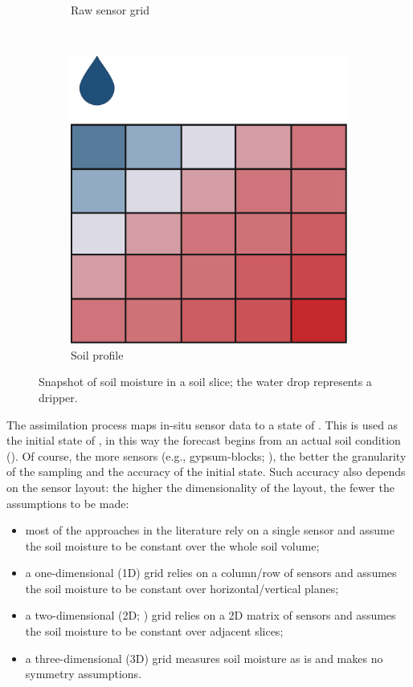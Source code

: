 \begin{figure}[t]
\begin{subfigure}[t]{.3\textwidth}
\caption{Raw sensor grid}
\label{orchard-fig:moisture-sens}
\end{subfigure}
~
\begin{subfigure}[t]{.3\textwidth}
\centering
\includegraphics[scale=.15]{chapters/physics-aware/orchard/img/soil-moisture-profile.pdf}
\caption{Soil profile}
\label{orchard-fig:moisture-profile}
\end{subfigure}
\caption{Snapshot of soil moisture in a soil slice; the water drop represents a dripper.}
\label{orchard-fig:moisture}
\end{figure}

The assimilation process maps in-situ sensor data to a state of \olab{}.
This is used as the initial state of \olab{}, in this way the forecast begins from an actual soil condition ().
Of course, the more sensors (e.g., gypsum-blocks; ), the better the granularity of the sampling and the accuracy of the initial state.
Such accuracy also depends on the sensor layout: the higher the dimensionality of the layout, the fewer the assumptions to be made:
\begin{itemize}
    \item most of the approaches in the literature rely on a single sensor and assume the soil moisture to be constant over the whole soil volume;
    \item a one-dimensional (1D) grid relies on a column/row of sensors and assumes the soil moisture to be constant over horizontal/vertical planes;
    \item a two-dimensional (2D; ) grid relies on a 2D matrix of sensors and assumes the soil moisture to be constant over adjacent slices;
    \item a three-dimensional (3D) grid measures soil moisture as is and makes no symmetry assumptions.
\end{itemize}

